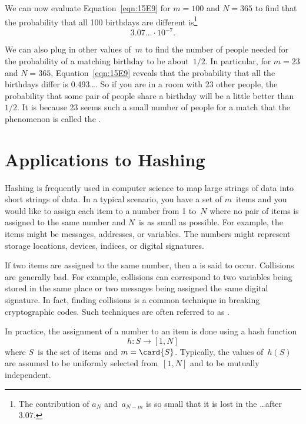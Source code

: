 We can  now evaluate Equation~\ref{eqn:15E9} for $m = 100$ and $N =
365$ to find that the probability that all 100 birthdays are different
is\footnote{The contribution of $a_N$ and~$a_{N - m}$ is so small that
  it is lost in the \dots after 3.07.}
\begin{equation*}
    3.07\ldots \cdot 10^{-7}.
\end{equation*}

We can also plug in other values of~$m$ to find the number of people
needed for the probability of a matching birthday to be about~$1/2$.
In particular, for $m = 23$ and $N = 365$, Equation~\ref{eqn:15E9}
reveals that the probability that all the birthdays differ is
0.493\dots.  So if you are in a room with 23 other people, the
probability that some pair of people share a birthday will be a little
better than~$1/2$.  It is because 23 seems such a small number of
people for a match that the phenomenon is called the .

\section{Applications to Hashing}

Hashing is frequently used in computer science to map large strings of
data into short strings of data.  In a typical scenario, you have a
set of $m$~items and you would like to assign each item to a number
from 1 to~$N$ where no pair of items is assigned to the same number
and $N$~is as small as possible.  For example, the items might be
messages, addresses, or variables.  The numbers might represent
storage locations, devices, indices, or digital signatures.

If two items are assigned to the same number, then a 
is said to occur.  Collisions are generally bad.  For example,
collisions can correspond to two variables being stored in the same
place or two messages being assigned the same digital signature.  In
fact, finding collisions is a common technique in breaking
cryptographic codes.  Such techniques are often referred to as
.

In practice, the assignment of a number to an item is done using a
hash function
\begin{equation*}
    h: S \to [1, N]
\end{equation*}
where $S$~is the set of items and $m = \card{S}$.  Typically, the
values of~$h(S)$ are assumed to be uniformly selected from~$[1, N]$
and to be mutually independent.

